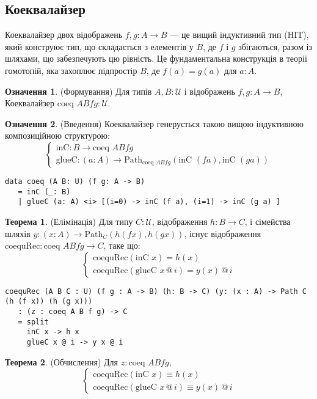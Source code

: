 \documentclass{article}
\theoremstyle{definition}
\newtheorem{theorem}{Теорема}
\newtheorem{definition}{Означення}
\begin{document}
\newpage
\subsection{Коеквалайзер}
Коеквалайзер двох відображень \( f, g : A \to B \) — це вищий індуктивний
тип (HIT), який конструює тип, що складається з елементів у \( B \),
де \( f \) і \( g \) збігаються, разом із шляхами, що забезпечують цю рівність.
Це фундаментальна конструкція в теорії гомотопій,
яка захоплює підпростір \( B \), де \( f(a) = g(a) \) для \( a : A \).

\begin{definition} (Формування)
Для типів \( A, B : \mathcal{U} \) і відображень \( f, g : A \to B \),
Коеквалайзер \( \text{coeq } A B f g : \mathcal{U} \).
\end{definition}

\begin{definition} (Введення)
Коеквалайзер генерується такою вищою
індуктивною композиційною структурою:
\[
\begin{cases}
\text{inC} : B \to \text{coeq } A B f g \\
\text{glueC} : (a : A) \to \text{Path}_{\text{coeq } A B f g} (\text{inC } (f a), \text{inC } (g a))
\end{cases}
\]
\begin{lstlisting}
data coeq (A B: U) (f g: A -> B)
   = inC (_: B)
   | glueC (a: A) <i> [(i=0) -> inC (f a), (i=1) -> inC (g a) ]
\end{lstlisting}
\end{definition}

\begin{theorem} (Елімінація)
Для типу \( C : \mathcal{U} \), відображення \( h : B \to C \), і сімейства шляхів \( y : (x : A) \to \text{Path}_C (h (f x), h (g x)) \), існує відображення \( \text{coequRec} : \text{coeq } A B f g \to C \), таке що:
\[
\begin{cases}
\text{coequRec}(\text{inC } x) = h(x) \\
\text{coequRec}(\text{glueC } x \, @ \, i) = y(x) \, @ \, i
\end{cases}
\]
\begin{lstlisting}
coequRec (A B C : U) (f g : A -> B) (h: B -> C) (y: (x : A) -> Path C (h (f x)) (h (g x)))
   : (z : coeq A B f g) -> C
   = split
     inC x -> h x
     glueC x @ i -> y x @ i
\end{lstlisting}
\end{theorem}

\begin{theorem} (Обчислення)
Для \( z : \text{coeq } A B f g \),
\[
\begin{cases}
\text{coequRec}(\text{inC } x) \equiv h(x) \\
\text{coequRec}(\text{glueC } x \, @ \, i) \equiv y(x) \, @ \, i
\end{cases}
\]
\end{theorem}
\end{document}
